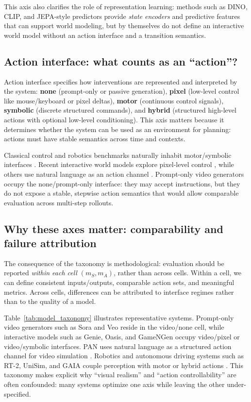 \documentclass{article}
\theoremstyle{plain}
\theoremstyle{definition}
\theoremstyle{remark}
\begin{document}
This axis also clarifies the role of representation learning: methods such as DINO, CLIP, and JEPA-style predictors \cite{caron2021dino,radford2021clip,lecun2022path,assran2023ijepa,bardes2024vjepa} provide \emph{state encoders} and predictive features that can support world modeling, but by themselves do not define an interactive world model without an action interface and a transition semantics.

\subsection{Action interface: what counts as an ``action''?}
Action interface specifies how interventions are represented and interpreted by the system:
\textbf{none} (prompt-only or passive generation), \textbf{pixel} (low-level control like mouse/keyboard or pixel deltas), \textbf{motor} (continuous control signals), \textbf{symbolic} (discrete structured commands), and \textbf{hybrid} (structured high-level actions with optional low-level conditioning). This axis matters because it determines whether the system can be used as an environment for planning: actions must have stable semantics across time and contexts.

Classical control and robotics benchmarks naturally inhabit motor/symbolic interfaces \cite{fu2021d4rl,yu2020metaworld,james2020rlbench,li2022behavior}. Recent interactive world models explore pixel-level control \cite{genie2024,oasis2024,gamengen2024}, while others use natural language as an action channel \cite{pan2025,unisim2024}. Prompt-only video generators occupy the none/prompt-only interface: they may accept instructions, but they do not expose a stable, stepwise action semantics that would allow comparable evaluation across multi-step rollouts.

\subsection{Why these axes matter: comparability and failure attribution}
The consequence of the taxonomy is methodological: evaluation should be reported \emph{within each cell} $(m_S, m_A)$, rather than across cells. Within a cell, we can define consistent inputs/outputs, comparable action sets, and meaningful metrics. Across cells, differences can be attributed to interface regimes rather than to the quality of a model.

Table~\ref{tab:model_taxonomy} illustrates representative systems. Prompt-only video generators such as Sora and Veo \cite{sora2024,veo2024} reside in the video/none cell, while interactive models such as Genie, Oasis, and GameNGen \cite{genie2024,oasis2024,gamengen2024} occupy video/pixel or video/symbolic interfaces. PAN uses natural language as a structured action channel for video simulation \cite{pan2025}. Robotics and autonomous driving systems such as RT-2, UniSim, and GAIA couple perception with motor or hybrid actions \cite{rt22023,unisim2024,gaia2023}. This taxonomy makes explicit why ``visual realism'' and ``action controllability'' are often confounded: many systems optimize one axis while leaving the other under-specified.
\end{document}
